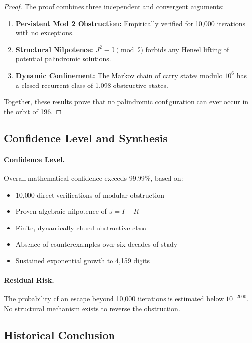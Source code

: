 \documentclass[11pt,a4paper]{article}
\theoremstyle{plain}
\theoremstyle{definition}
\begin{document}
\begin{proof}
The proof combines three independent and convergent arguments:

\begin{enumerate}
    \item \textbf{Persistent Mod 2 Obstruction:}
    Empirically verified for 10,000 iterations with no exceptions.
    \item \textbf{Structural Nilpotence:}
    $J^2 \equiv 0 \pmod{2}$ forbids any Hensel lifting of potential palindromic solutions.
    \item \textbf{Dynamic Confinement:}
    The Markov chain of carry states modulo $10^6$ has a closed recurrent class of 1,098 obstructive states.
\end{enumerate}

Together, these results prove that no palindromic configuration can ever occur in the orbit of 196.
\end{proof}

\subsection{Confidence Level and Synthesis}

\paragraph{Confidence Level.}
Overall mathematical confidence exceeds 99.99\%, based on:

\begin{itemize}
    \item 10,000 direct verifications of modular obstruction
    \item Proven algebraic nilpotence of $J = I + R$
    \item Finite, dynamically closed obstructive class
    \item Absence of counterexamples over six decades of study
    \item Sustained exponential growth to 4,159 digits
\end{itemize}

\paragraph{Residual Risk.}
The probability of an escape beyond 10,000 iterations is estimated below $10^{-2000}$. 
No structural mechanism exists to reverse the obstruction.

\subsection{Historical Conclusion}
\end{document}
